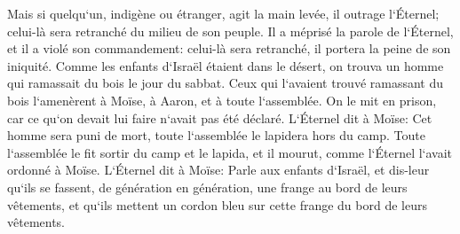 \verse Mais si quelqu`un, indigène ou étranger, agit la main levée, il outrage l`Éternel; celui-là sera retranché du milieu de son peuple. 
\verse Il a méprisé la parole de l`Éternel, et il a violé son commandement: celui-là sera retranché, il portera la peine de son iniquité. 
\verse Comme les enfants d`Israël étaient dans le désert, on trouva un homme qui ramassait du bois le jour du sabbat. 
\verse Ceux qui l`avaient trouvé ramassant du bois l`amenèrent à Moïse, à Aaron, et à toute l`assemblée. 
\verse On le mit en prison, car ce qu`on devait lui faire n`avait pas été déclaré. 
\verse L`Éternel dit à Moïse: Cet homme sera puni de mort, toute l`assemblée le lapidera hors du camp. 
\verse Toute l`assemblée le fit sortir du camp et le lapida, et il mourut, comme l`Éternel l`avait ordonné à Moïse. 
\verse L`Éternel dit à Moïse: 
\verse Parle aux enfants d`Israël, et dis-leur qu`ils se fassent, de génération en génération, une frange au bord de leurs vêtements, et qu`ils mettent un cordon bleu sur cette frange du bord de leurs vêtements. 
